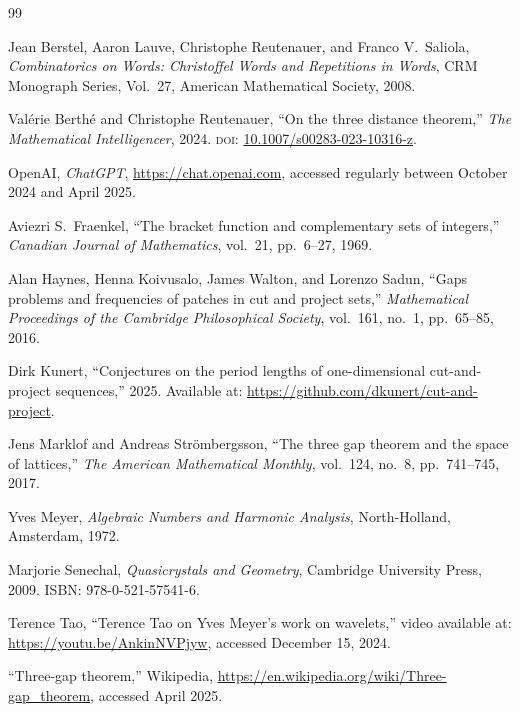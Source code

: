\documentclass[11pt]{article}
\theoremstyle{plain}
\theoremstyle{definition}
\theoremstyle{remark}
\begin{document}
\begin{thebibliography}{99}

Jean Berstel, Aaron Lauve, Christophe Reutenauer, and Franco V.\ Saliola,
\emph{Combinatorics on Words: Christoffel Words and Repetitions in Words},
CRM Monograph Series, Vol.~27,
American Mathematical Society, 2008.

Val\'{e}rie Berth\'{e} and Christophe Reutenauer,
``On the three distance theorem,''
\emph{The Mathematical Intelligencer}, 2024.
\textsc{doi}: \href{https://doi.org/10.1007/s00283-023-10316-z}%
{10.1007/s00283-023-10316-z}.

OpenAI,
\emph{ChatGPT},
\url{https://chat.openai.com}, accessed regularly between October 2024 and
April 2025.

Aviezri S.\ Fraenkel,
``The bracket function and complementary sets of integers,''
\emph{Canadian Journal of Mathematics}, vol.~21, pp.~6--27, 1969.

Alan Haynes, Henna Koivusalo, James Walton, and Lorenzo Sadun,
``Gaps problems and frequencies of patches in cut and project sets,''
\emph{Mathematical Proceedings of the Cambridge Philosophical Society},
vol.~161, no.~1, pp.~65--85, 2016.

Dirk Kunert,
``Conjectures on the period lengths of one-dimensional cut-and-project
sequences,'' 2025.
Available at: \url{https://github.com/dkunert/cut-and-project}.

Jens Marklof and Andreas Str\"{o}mbergsson,
``The three gap theorem and the space of lattices,''
\emph{The American Mathematical Monthly}, vol.~124, no.~8, pp.~741--745, 2017.

Yves Meyer,
\emph{Algebraic Numbers and Harmonic Analysis},
North-Holland, Amsterdam, 1972.

Marjorie Senechal,
\emph{Quasicrystals and Geometry},
Cambridge University Press, 2009.
ISBN: 978-0-521-57541-6.

Terence Tao,
``Terence Tao on Yves Meyer's work on wavelets,''
video available at: \url{https://youtu.be/AnkinNVPjyw}, accessed
December 15, 2024.

``Three-gap theorem,''
Wikipedia,
\url{https://en.wikipedia.org/wiki/Three-gap_theorem}, accessed April 2025.

\end{thebibliography}
\end{document}
